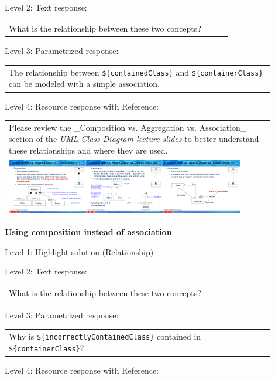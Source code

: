 \noindent Level 2: Text response: \medskip

\begin{tabular}{|p{0.9\linewidth}}
What is the relationship between these two concepts?
\end{tabular} \medskip

\noindent Level 3: Parametrized response: \medskip

\begin{tabular}{|p{0.9\linewidth}}
The relationship between \verb|${containedClass}| and \verb|${containerClass}| can be modeled with a simple association.
\end{tabular} \medskip

\noindent Level 4: Resource response with Reference: \medskip

\begin{tabular}{|p{0.9\linewidth}}
Please review the _Composition vs. Aggregation vs. Association_ section of 
the \textit{UML Class Diagram lecture slides} to 
better understand these relationships and where they are used.

\\
\includegraphics[width=0.9\textwidth]{images/composition_aggregation_association.png}
\end{tabular} \medskip


\noindent \textbf{Using composition instead of association} \medskip

\noindent Level 1: Highlight solution (Relationship) \medskip

\noindent Level 2: Text response: \medskip

\begin{tabular}{|p{0.9\linewidth}}
What is the relationship between these two concepts?
\end{tabular} \medskip

\noindent Level 3: Parametrized response: \medskip

\begin{tabular}{|p{0.9\linewidth}}
Why is \verb|${incorrectlyContainedClass}| contained in \verb|${containerClass}|?
\end{tabular} \medskip

\noindent Level 4: Resource response with Reference: \medskip

